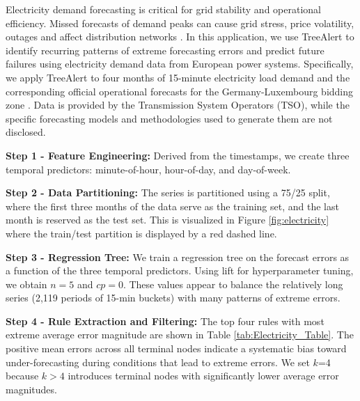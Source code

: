 \documentclass[]{interact}
\theoremstyle{plain}
\theoremstyle{definition}
\theoremstyle{remark}
\begin{document}
Electricity demand forecasting is critical for grid stability and operational efficiency. Missed forecasts of demand peaks can cause grid stress, price volatility, outages and affect distribution networks \citep{ciarreta2023, gilbert2023, steinbuks2019}. In this application, we use TreeAlert to identify recurring patterns of extreme forecasting errors and predict future failures using electricity demand data from European power systems. Specifically, we apply TreeAlert to four months of 15-minute electricity load demand and the corresponding official operational forecasts for the Germany-Luxembourg bidding zone \citep{entsoe2025}. Data is provided by the Transmission System Operators (TSO), while the specific forecasting models and methodologies used to generate them are not disclosed.
\newline

\noindent\textbf{Step 1 - Feature Engineering:} Derived from the timestamps, we create three temporal predictors: minute-of-hour, hour-of-day, and day-of-week.
\newline

\noindent\textbf{Step 2 - Data Partitioning:} The series is partitioned using a 75/25 split, where the first three months of the data serve as the training set, and the last month is reserved as the test set. This is visualized in Figure \ref{fig:electricity} where the train/test partition is displayed by a red dashed line.
\newline

\noindent\textbf{Step 3 - Regression Tree:} We train a regression tree on the forecast errors as a function of the three temporal predictors. Using lift for hyperparameter tuning, we obtain $n = 5$ and $cp = 0$. These values appear to balance the relatively long series (2,119 periods of 15-min buckets) with many patterns of extreme errors.
\newline

\noindent\textbf{Step 4 - Rule Extraction and Filtering:} \label{sec:rule_filtering}
The top four rules with most extreme average error magnitude are shown in Table \ref{tab:Electricity_Table}.
The positive mean errors across all terminal nodes indicate a systematic bias toward under-forecasting during conditions that lead to extreme errors. We set $k$=4 because $k>4$ introduces terminal nodes with significantly lower
average error magnitudes.
\newline
\end{document}
